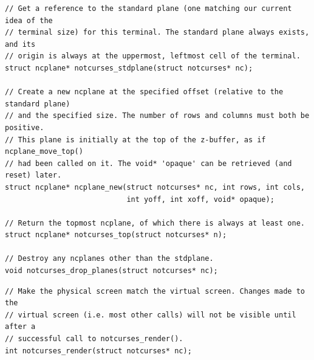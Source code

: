 \documentclass[letterpaper,10pt]{article}
\begin{document}
\begin{listing}[!htbp]
\begin{verbatim}
// Get a reference to the standard plane (one matching our current idea of the
// terminal size) for this terminal. The standard plane always exists, and its
// origin is always at the uppermost, leftmost cell of the terminal.
struct ncplane* notcurses_stdplane(struct notcurses* nc);

// Create a new ncplane at the specified offset (relative to the standard plane)
// and the specified size. The number of rows and columns must both be positive.
// This plane is initially at the top of the z-buffer, as if ncplane_move_top()
// had been called on it. The void* 'opaque' can be retrieved (and reset) later.
struct ncplane* ncplane_new(struct notcurses* nc, int rows, int cols,
                            int yoff, int xoff, void* opaque);

// Return the topmost ncplane, of which there is always at least one.
struct ncplane* notcurses_top(struct notcurses* n);

// Destroy any ncplanes other than the stdplane.
void notcurses_drop_planes(struct notcurses* nc);
\end{verbatim}
\end{listing}

\begin{listing}[!htbp]
\begin{verbatim}
// Make the physical screen match the virtual screen. Changes made to the
// virtual screen (i.e. most other calls) will not be visible until after a
// successful call to notcurses_render().
int notcurses_render(struct notcurses* nc);
\end{verbatim}
\end{listing}
\end{document}
